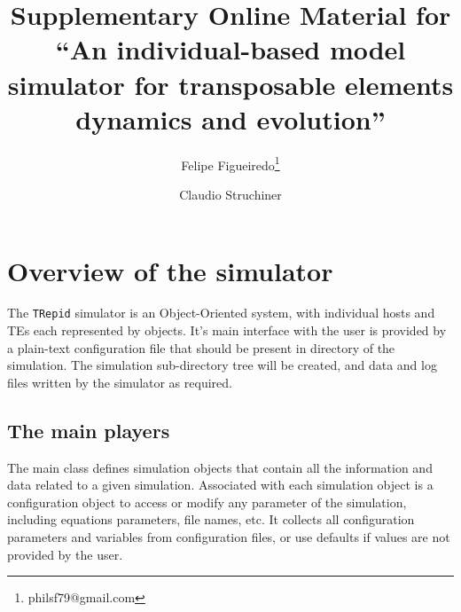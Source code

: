\documentclass[10pt]{article}
\begin{document}
\title{Supplementary Online Material for ``An individual-based model
  simulator for transposable elements dynamics and evolution''}


\author{Felipe Figueiredo\footnote{philsf79@gmail.com} \and
  Claudio Struchiner }



\maketitle
\tableofcontents

\section{Overview of the simulator}


The \verb|TRepid| simulator is an Object-Oriented system, with
individual hosts and TEs each represented by objects. It's main
interface with the user is provided by a plain-text configuration file
that should be present in directory of the simulation. The simulation
sub-directory tree will be created, and data and log files written by
the simulator as required.

\subsection{The main players}
\label{sec:main_players}

The main class defines simulation objects that contain all the
information and data related to a given simulation. Associated with
each simulation object is a configuration object to access or modify
any parameter of the simulation, including equations parameters, file
names, etc. It collects all configuration parameters and variables
from configuration files, or use defaults if values are not provided
by the user.




\end{document}
